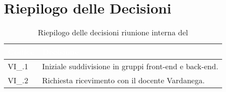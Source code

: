 \section{Riepilogo delle Decisioni}


\begin{table}[!htbp]
\renewcommand{\arraystretch}{1.5}
\begin{tabular}{m{}<{\centering}  m{}<{\centering}}
\rowcolor{darkblue} \textcolor{white}{\textbf{Codice}} & \textcolor{white}{\textbf{Decisione}} \\
\hline
VI\_{}\D{}.1 & Iniziale suddivisione in gruppi front-end e back-end.\\
VI\_{}\D{}.2 & Richiesta ricevimento con il docente Vardanega.\\
\end{tabular}
\caption{Riepilogo delle decisioni riunione interna del \D}
\end{table}